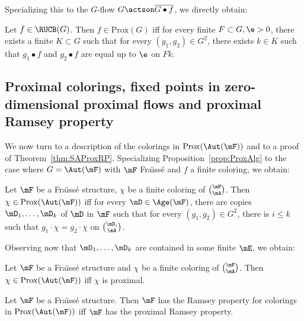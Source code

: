Specializing this to the $G$-flow $G\actson \overline{G\bullet f}$, we directly obtain:

\begin{prop}\label{prop:ProxAlg}
Let $f\in \RUCB(G)$. Then $f\in \mathrm{Prox}(G)$ iff for every finite $F\subset G, \e>0$, there exists a finite $K\subset G$ such that for every $(g_{1}, g_{2})\in G^{2}$, there exists $k\in K$ such that $g_{1}\bullet f$ and $g_{2}\bullet f$ are equal up to $\e$ on $Fk$.
\end{prop}


\subsection{Proximal colorings, fixed points in zero-dimensional proximal flows and proximal Ramsey property}
\label{section:ProxColorings}

We now turn to a description of the colorings in $\mathrm{Prox}(\Aut(\mF))$ and to a proof of Theorem~\ref{thm:SAProxRP}. Specializing Proposition~\ref{prop:ProxAlg} to the case where $G=\Aut(\mF)$ with $\mF$ Fra\"{\i}ss\'e and $f$ a finite coloring, we obtain:

\begin{prop}
Let $\mF$ be a Fra\"{\i}ss\'e structure, $\chi$ be a finite coloring of $\binom{\mF}{\mA}$. Then $\chi \in \mathrm{Prox}(\Aut(\mF))$ iff for every $\mD \in \Age(\mF)$, there are copies $\mD_{1},\ldots,\mD_{k}$ of $\mD$ in $\mF$ such that for every $(g_{1}, g_{2})\in G^{2}$, there is $i\leq k$ such that $g_{1}\cdot \chi = g_{2}\cdot \chi$ on $\binom{\mD_{i}}{\mA}$.
\end{prop}

Observing now that $\mD_{1},\ldots,\mD_{k}$ are contained in some finite $\mE$, we obtain:

\begin{prop}\label{prop:ProxColorings}
Let $\mF$ be a Fra\"{\i}ss\'e structure and $\chi$ be a finite coloring of $\binom{\mF}{\mA}$. Then $\chi \in \mathrm{Prox}(\Aut(\mF))$ iff $\chi$ is proximal.
\end{prop}

\begin{prop}
Let $\mF$ be a Fra\"{\i}ss\'e structure. Then $\mF$ has the Ramsey property for colorings in $\mathrm{Prox}(\Aut(\mF))$ iff $\mF$ has the proximal Ramsey property.
\end{prop}

